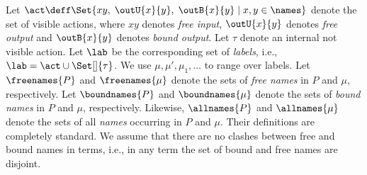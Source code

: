 \documentclass[11pt,techReport]{eptcs}
\begin{document}
Let $ \act \deff \Set{ x{y},\; \outU{x}{{y}},\; \outB{x}{{y}} \mid x,y \in \names } $ denote the set of visible actions, where $x{y}$ denotes \emph{free input}, $ \outU{x}{y} $ denotes \emph{free output} and $ \outB{x}{{y}} $ denotes \emph{bound output}. Let $ \tau $ denote an internal not visible action. Let $ \lab $ be the corresponding set of \emph{labels}, i.e., $ \lab = \act \cup \Set[]{ \tau } $. We use $ \mu, \mu', \mu_1, \ldots $ to range over labels. Let $ \freenames{P} $ and $ \freenames{\mu} $  denote the sets of \emph{free names} in $ P $ and $\mu$, respectively. Let $ \boundnames{P} $ and $ \boundnames{\mu} $ denote the sets of \emph{bound names} in $P$ and $ \mu $, respectively. Likewise, $ \allnames{P} $  and $ \allnames{\mu} $ denote the sets of all \emph{names} occurring in $P$ and $ \mu$. Their definitions are completely standard. We assume that there are no clashes between free and bound names in terms, i.e., in any term the set of bound and free names are disjoint.
\end{document}
